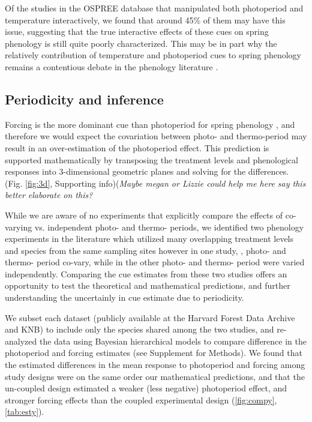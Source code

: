 \documentclass[11pt]{article}
\begin{document}
{Of the studies in the OSPREE database that manipulated both photoperiod and temperature interactively, we found that around 45\% of them may have this issue, suggesting that the true interactive effects of these cues on spring phenology is still quite poorly characterized. This may be in part why the relatively contribution of temperature and photoperiod cues to spring phenology remains a contentious debate in the phenology literature \citep{koerner2010a}.

\subsection*{Periodicity and inference}
Forcing is the more dominant cue than photoperiod for spring phenology \citep{CHUINE:2010wg}, and therefore we would expect the covariation between photo- and thermo-period may result in an over-estimation of the photoperiod effect. %
This prediction is supported mathematically by transposing the treatment levels and phenological responses into 3-dimensional geometric planes and solving for the differences. (Fig. \ref{fig:3d}, Supporting info)(\textit{Maybe megan or Lizzie could help me here say this better elaborate on this?}

While we are aware of no experiments that explicitly compare the effects of co-varying vs. independent photo- and thermo- periods, we identified two phenology experiments in the literature which utilized many overlapping treatment levels and species from the same sampling sites however in one study, \citet{Flynn2018}, photo- and thermo- period co-vary, while in the other \citet{Buonaiuto:2021ug}  photo- and thermo- period were varied independently. Comparing the cue estimates from these two studies offers an opportunity to test the theoretical and mathematical predictions, and further understanding the uncertainly in cue estimate due to periodicity.

We subset each dataset (publicly available at the Harvard Forest Data Archive and KNB) to include only the species shared among the two studies, and re-analyzed the data using Bayesian hierarchical models to compare difference in the photoperiod and forcing estimates (see Supplement for Methods). We found that the estimated differences in the mean response to photoperiod and forcing%
among study designs were on the same order our mathematical predictions, and that the un-coupled design estimated a weaker (less negative) photoperiod effect, and stronger forcing%
effects than the coupled experimental design (\ref{fig:compy},\ref{tab:esty}). \\

}
\end{document}
